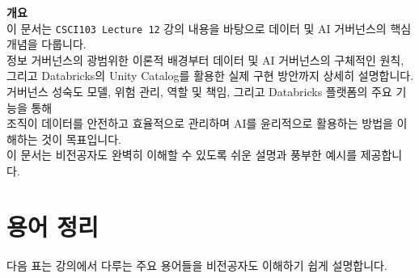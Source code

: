 \documentclass[11pt,a4paper]{article}
\begin{document}
\begin{tcolorbox}[summarybox]
\textbf{개요} \\
이 문서는 \texttt{CSCI103 Lecture 12} 강의 내용을 바탕으로 데이터 및 AI 거버넌스의 핵심 개념을 다룹니다. \\
정보 거버넌스의 광범위한 이론적 배경부터 데이터 및 AI 거버넌스의 구체적인 원칙, \\
그리고 Databricks의 Unity Catalog를 활용한 실제 구현 방안까지 상세히 설명합니다. \\
거버넌스 성숙도 모델, 위험 관리, 역할 및 책임, 그리고 Databricks 플랫폼의 주요 기능을 통해 \\
조직이 데이터를 안전하고 효율적으로 관리하며 AI를 윤리적으로 활용하는 방법을 이해하는 것이 목표입니다. \\
이 문서는 비전공자도 완벽히 이해할 수 있도록 쉬운 설명과 풍부한 예시를 제공합니다.
\end{tcolorbox}

\newpage
\section*{용어 정리}

다음 표는 강의에서 다루는 주요 용어들을 비전공자도 이해하기 쉽게 설명합니다.
\end{document}
